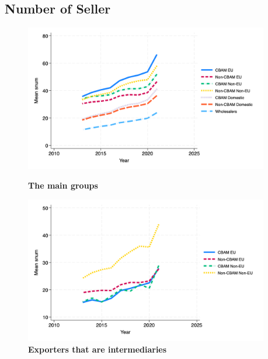 \documentclass{article}
\begin{document}
\subsection{Number of Seller}
\begin{figure}[H]
\centering
\includegraphics[width=0.95\textwidth]{snum_main_groups.png}
\caption{\textbf{The main groups}}
\includegraphics[width=0.95\textwidth]{snum_ei.png}
\caption{\textbf{Exporters that are intermediaries}}
\end{figure}
\end{document}

